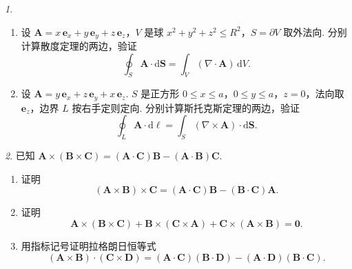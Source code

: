 \documentclass[11pt]{article}
\theoremstyle{remark}
\newtheorem{problem}{}
\begin{document}
\begin{problem}
  \begin{enumerate}
    \item 设 $\mathbf{A}=x\,\mathbf{e}_x+y\,\mathbf{e}_y+z\,\mathbf{e}_z$，$V$ 是球 $x^2+y^2+z^2\le R^2$，$S=\partial V$ 取外法向. 分别计算散度定理的两边，验证
      \[
        \oint_S\mathbf{A}\cdot\mathrm{d}\mathbf{S}
        =\int_V(\nabla\cdot\mathbf{A})\,\mathrm{d}V.
      \]
    \item 设 $\mathbf{A}=y\,\mathbf{e}_x+z\,\mathbf{e}_y+x\,\mathbf{e}_z$. $S$ 是正方形 $0\le x\le a$，$0\le y\le a$，$z=0$，法向取 $\mathbf{e}_z$，边界 $L$ 按右手定则定向. 分别计算斯托克斯定理的两边，验证
      \[
        \oint_L\mathbf{A}\cdot\mathrm{d}\boldsymbol{\ell}
        =\int_S(\nabla\times\mathbf{A})\cdot\mathrm{d}\mathbf{S}.
      \]
  \end{enumerate}
\end{problem}

\vspace{1.6em}

\begin{problem}
  已知
  $\mathbf{A}\times(\mathbf{B}\times\mathbf{C})
  =(\mathbf{A}\cdot\mathbf{C})\mathbf{B}-(\mathbf{A}\cdot\mathbf{B})\mathbf{C}$.
  \begin{enumerate}
    \item 证明
      \[
        (\mathbf{A}\times\mathbf{B})\times\mathbf{C}
        =(\mathbf{A}\cdot\mathbf{C})\mathbf{B}
         -(\mathbf{B}\cdot\mathbf{C})\mathbf{A}.
      \]
    \item 证明
      \[
        \mathbf{A}\times(\mathbf{B}\times\mathbf{C})
        +\mathbf{B}\times(\mathbf{C}\times\mathbf{A})
        +\mathbf{C}\times(\mathbf{A}\times\mathbf{B})
        =\mathbf{0}.
      \]
    \item 用指标记号证明拉格朗日恒等式
      \[
        (\mathbf{A}\times\mathbf{B})\cdot(\mathbf{C}\times\mathbf{D})
        =(\mathbf{A}\cdot\mathbf{C})(\mathbf{B}\cdot\mathbf{D})
         -(\mathbf{A}\cdot\mathbf{D})(\mathbf{B}\cdot\mathbf{C}).
      \]
  \end{enumerate}
\end{problem}

\vspace{1.6em}

\end{document}
